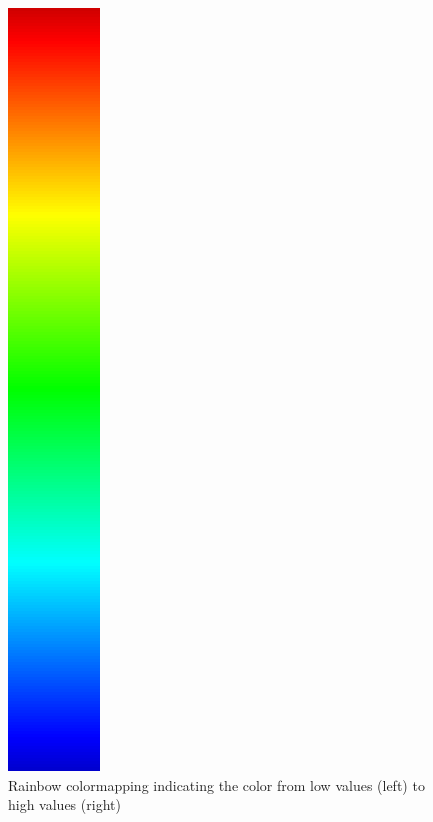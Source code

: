 \begin{description}
\begin{figure}[htb]
				\includegraphics[angle=270, width=\linewidth, totalheight=1em, frame]{./content/pictures/rainbow.png}
				\caption{Rainbow colormapping indicating the color from low values (left) to high values (right)}
			\end{figure}


\end{description}
